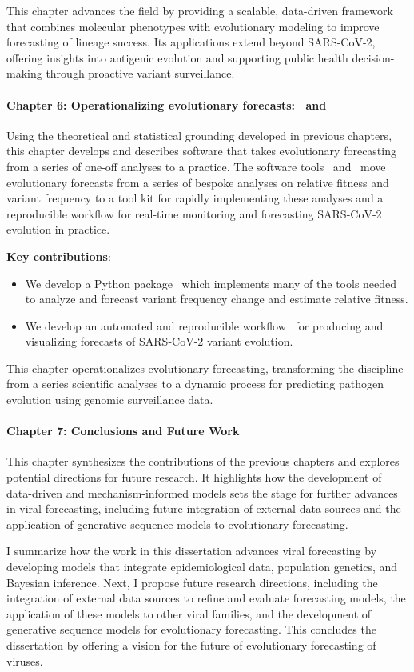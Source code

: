 This chapter advances the field by providing a scalable, data-driven framework that combines molecular phenotypes with evolutionary modeling to improve forecasting of lineage success.
Its applications extend beyond SARS-CoV-2, offering insights into antigenic evolution and supporting public health decision-making through proactive variant surveillance.

\paragraph{Chapter 6: Operationalizing evolutionary forecasts: \evofr\ and \forecastsNcov}

Using the theoretical and statistical grounding developed in previous chapters, this chapter develops and describes software that takes evolutionary forecasting from a series of one-off analyses to a practice.
The software tools \evofr\ and \forecastsNcov\ move evolutionary forecasts from a series of bespoke analyses on relative fitness and variant frequency to a tool kit for rapidly implementing these analyses and a reproducible workflow for real-time monitoring and forecasting SARS-CoV-2 evolution in practice.

\noindent\textbf{Key contributions}:
\begin{itemize}
  \item We develop a Python package \evofr\ which implements many of the tools needed to analyze and forecast variant frequency change and estimate relative fitness.
  \item We develop an automated and reproducible workflow \forecastsNcov\ for producing and visualizing forecasts of SARS-CoV-2 variant evolution.
\end{itemize}

This chapter operationalizes evolutionary forecasting, transforming the discipline from a series scientific analyses to a dynamic process for predicting pathogen evolution using genomic surveillance data.

\paragraph{Chapter 7: Conclusions and Future Work}

This chapter synthesizes the contributions of the previous chapters and explores potential directions for future research.
It highlights how the development of data-driven and mechanism-informed models sets the stage for further advances in viral forecasting, including future integration of external data sources and the application of generative sequence models to evolutionary forecasting.

I summarize how the work in this dissertation advances viral forecasting by developing models that integrate epidemiological data, population genetics, and Bayesian inference.
Next, I propose future research directions, including the integration of external data sources to refine and evaluate forecasting models, the application of these models to other viral families, and the development of generative sequence models for evolutionary forecasting.
This concludes the dissertation by offering a vision for the future of evolutionary forecasting of viruses.

